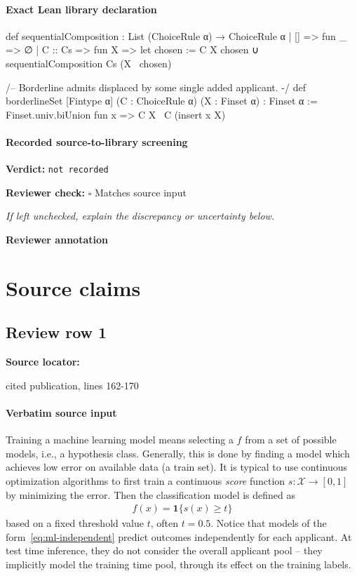 \documentclass[10pt]{article}
\newcommand{\reviewerbox}{%
  \par\noindent\fbox{\parbox{0.96\linewidth}{\rule{0pt}{0.38in}}}\par
}
\newcommand{\reviewmatch}[1]{%
  \par\noindent\textbf{Reviewer check:} $\square$\; #1\par
  \noindent\emph{If left unchecked, explain the discrepancy or uncertainty below.}\par
}
\begin{document}
\paragraph{Exact Lean library declaration}
\begin{ReviewVerbatim}
def sequentialComposition : List (ChoiceRule α) → ChoiceRule α
  | [] => fun _ => ∅
  | C :: Cs =>
      fun X =>
        let chosen := C X
        chosen ∪ sequentialComposition Cs (X \ chosen)

/-- Borderline admits displaced by some single added applicant. -/
def borderlineSet [Fintype α] (C : ChoiceRule α) (X : Finset α) : Finset α :=
  Finset.univ.biUnion fun x => C X \ C (insert x X)
\end{ReviewVerbatim}

\paragraph{Recorded source-to-library screening}
\textbf{Verdict:} \texttt{not recorded}
\reviewmatch{Matches source input}
\noindent\textbf{Reviewer annotation}\par
\reviewerbox

\clearpage
\hypertarget{source-claim-03de8677e0f95903}{}
\hypertarget{source-section-f10b5f68e4acf3dc}{}
\section*{Source claims}
\subsection*{Review row 1}
\textbf{Source locator:} {\footnotesize\raggedright cited publication, lines 162-\allowbreak{}170\par}
\paragraph{Verbatim source input}
\begin{ReviewVerbatim}
Training a machine learning model means selecting a $f$ from a set of possible models, i.e., a hypothesis class.
Generally, this is done by finding a model which achieves low error on available data (a train set).
It is typical to use continuous optimization algorithms to first train a continuous \emph{score} function $s:\mathcal X\to [0,1]$ by minimizing the error.
Then the classification model is defined as
\begin{align}\label{eq:ml-independent}
    f(x) = \mathbf 1\{s(x)\geq t\}
\end{align} based on a fixed threshold value $t$, often $t=0.5$.
Notice that models of the form~\eqref{eq:ml-independent} predict outcomes independently for each applicant.
At test time inference, they do not consider the overall applicant pool -- they implicitly model the training time pool, through its effect on the training labels.
\end{ReviewVerbatim}
\end{document}
